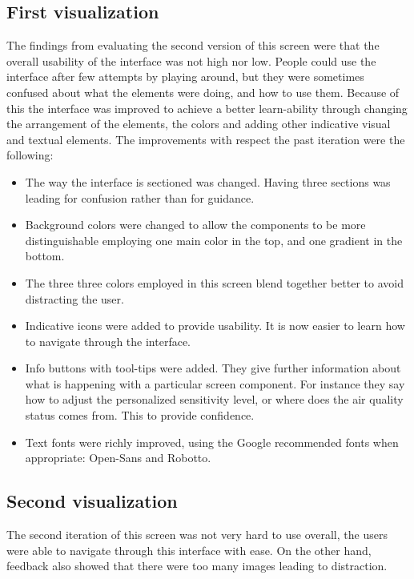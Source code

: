 \subsection{First visualization}
The findings from evaluating the second version of this screen were that the overall usability of the interface was not high nor low. People could use the interface after few attempts by playing around, but they were sometimes confused about what the elements were doing, and how to use them. Because of this the interface was improved to achieve a better learn-ability through changing the arrangement of the elements, the colors and adding other indicative visual and textual elements.
The improvements with respect the past iteration were the following:
\begin{itemize}
	\item  The way the interface is sectioned was changed. Having three sections was leading for confusion rather than for guidance.
    \item Background colors were changed to allow the components to be more distinguishable employing one main color in the top, and one gradient in the bottom.
    \item  The three three colors employed in this screen blend together better to avoid distracting the user.
    \item Indicative icons were added to provide usability. It is now easier to learn how to navigate through the interface.
    \item Info buttons with tool-tips were added. They give further information about what is happening with a particular screen component. For instance they say how to adjust the personalized sensitivity level, or where does the air quality status comes from. This to provide confidence. 
    \item Text fonts were richly improved, using the Google recommended fonts when appropriate:  Open-Sans and Robotto.
\end{itemize}

\subsection{Second visualization}
The second iteration of this screen was not very hard to use overall, the users were able to navigate through this interface with ease. On the other hand, feedback also showed that there were too many images leading to distraction. 

